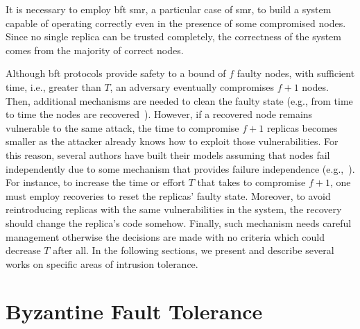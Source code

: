 It is necessary to employ \gls{bft} \gls{smr}, a particular case of \gls{smr}, to build a system capable of operating correctly even in the presence of some compromised nodes.
Since no single replica can be trusted completely, the correctness of the system comes from the majority of correct nodes. 


Although \gls{bft} protocols provide safety to a bound of $f$ faulty nodes, with sufficient time, i.e., greater than $T$, an adversary eventually compromises $f+1$ nodes.
Then, additional mechanisms are needed to clean the faulty state (e.g., from time to time the nodes are recovered~\cite{Castro:2002}).
However, if a recovered node remains vulnerable to the same attack, the time to compromise $f+1$ replicas becomes smaller as the attacker already knows how to exploit those vulnerabilities.
For this reason, several authors have built their models assuming that nodes fail independently due to some mechanism that provides failure independence (e.g.,~\cite{Castro:2002,Bessani:2008,Veronese:2013,Sousa:2010}).
For instance, to increase the time or effort $T$ that takes to compromise $f+1$, one must employ recoveries to reset the replicas' faulty state. 
Moreover, to avoid reintroducing replicas with the same vulnerabilities in the system, the recovery should change the replica's code somehow.
Finally, such mechanism needs careful management otherwise the decisions are made with no criteria which could decrease $T$ after all.
In the following sections, we present and describe several works on specific areas of intrusion tolerance.


\section{Byzantine Fault Tolerance}

